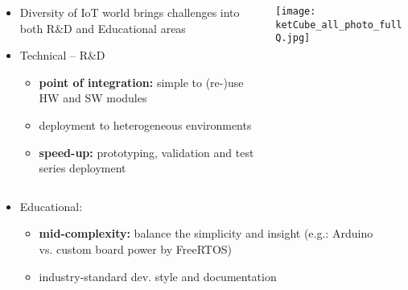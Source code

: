 
\begin{frame}%
    \begin{columns}
      \begin{column}{0.6\paperwidth}
         
         \begin{itemize}
           \item Diversity of IoT world brings challenges into both R\&D and Educational areas
           \item Technical -- R\&D
           \begin{itemize}
             \item {\bf point of integration:} simple to (re-)use HW and SW modules
             \item deployment to heterogeneous environments
             \item {\bf speed-up:} prototyping, validation and test series deployment
           \end{itemize}
         \end{itemize}
      \end{column}
      \begin{column}{0.4\paperwidth}
         \centering
         \texttt{[image: ketCube\_all\_photo\_fullQ.jpg]}
         \vfill
       \end{column}
    \end{columns}
  
  \flushleft
  \begin{columns}
      \begin{column}{0.95\paperwidth}
        \begin{itemize}
          \item Educational:
           \begin{itemize}
             \item {\bf mid-complexity:} balance the simplicity and insight (e.g.: Arduino vs. custom board power by FreeRTOS)
             \item industry-standard dev. style and documentation
           \end{itemize}
          \end{itemize}
        \end{column}
      \begin{column}{0.05\paperwidth}
         \centering
         ~
       \end{column}
    \end{columns}
  
\end{frame}

